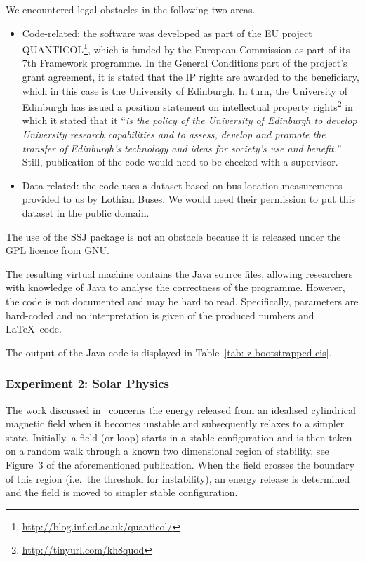 We encountered legal obstacles in the following two areas.
\begin{itemize} 
\item Code-related: the software was developed as part of the EU project
QUANTICOL\footnote{\url{http://blog.inf.ed.ac.uk/quanticol/}}, which is funded by the European Commission as part of its 7th
Framework programme. In the General Conditions part of the project's grant
agreement, it is stated that the IP rights are awarded to the beneficiary, which
in this case is the University of Edinburgh. In turn, the University of
Edinburgh has issued a position statement on intellectual property
rights\footnote{\url{http://tinyurl.com/kh8quod}}
in which it stated that it ``\emph{is the policy of the University of Edinburgh to develop University research capabilities and to assess, develop and promote the transfer of Edinburgh's technology and ideas for society's use and benefit.}'' Still, publication of the code would need to be checked with a supervisor.
\item Data-related: the code uses a dataset based on bus location measurements provided to us by Lothian Buses. We would need their permission to put this dataset in the public domain.
\end{itemize}
The use of the SSJ package is not an obstacle because it is released under the GPL licence from GNU.

The resulting virtual machine contains the Java source files, allowing
researchers with knowledge of Java to analyse the correctness of the programme.
However, the code is not documented and may be hard to read. Specifically,
parameters are hard-coded and no interpretation is given of the produced
numbers and \LaTeX\ code.

The output of the Java code is displayed in Table~\ref{tab: z bootstrapped cis}.



\subsubsection*{Experiment 2: Solar Physics}


The work discussed in~\cite{bareford2010nanoflare} concerns the energy released
from an idealised cylindrical magnetic field when it becomes unstable and
subsequently relaxes to a simpler state. Initially, a field (or loop) starts in
a stable configuration and is then taken on a random walk through a known two
dimensional region of stability, see \mbox{Figure 3} of the aforementioned
publication. When the field crosses the boundary of this region (i.e.\ the threshold for instability), an energy release is determined and the field is moved to simpler stable configuration. 

